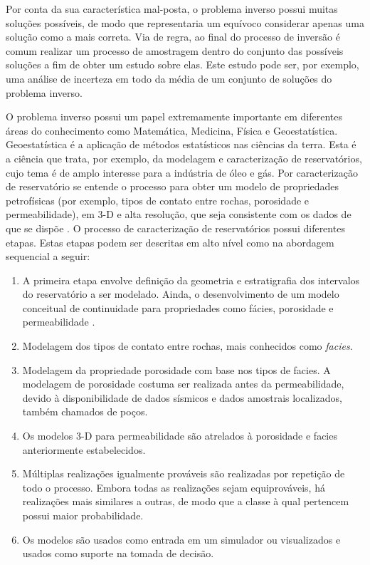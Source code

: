 Por conta da sua característica mal-posta, o problema inverso
possui muitas soluções possíveis, de modo que representaria um equívoco considerar apenas
uma solução como a mais correta. Via de regra, ao final do processo de inversão é comum
realizar um processo de amostragem dentro do conjunto das possíveis soluções a fim
de obter um estudo sobre elas. Este estudo pode ser, por exemplo, uma análise de 
incerteza em todo da média de um conjunto de soluções do problema inverso.

O problema inverso possui um papel extremamente importante em diferentes áreas do conhecimento
como Matemática, Medicina, Física e Geoestatística. Geoestatística é a aplicação de métodos
estatísticos nas ciências da terra. Esta é a ciência que trata, por exemplo, da modelagem
e caracterização de reservatórios, cujo tema é de amplo interesse para a indústria de óleo
e gás. Por caracterização de reservatório se entende o processo para obter um modelo de propriedades
petrofísicas (por exemplo, tipos de contato entre rochas, porosidade e permeabilidade),
em 3-D e alta resolução, que seja consistente com os dados de que se dispõe \cite{deutsch2002}.
O processo de caracterização de reservatórios possui diferentes
etapas. Estas etapas podem ser descritas em alto nível como na
abordagem sequencial a seguir:
\begin{enumerate}
 \item A primeira etapa envolve definição da geometria e estratigrafia dos intervalos do reservatório
 a ser modelado. Ainda, o desenvolvimento de um modelo conceitual de continuidade para
 propriedades como fácies, porosidade e permeabilidade \label{itm:1}.
 \item Modelagem dos tipos de contato entre rochas, mais conhecidos como \textit{facies}\label{itm:2}.
 \item Modelagem da propriedade porosidade com base nos tipos de facies. A modelagem de porosidade
 costuma ser realizada antes da permeabilidade, devido à disponibilidade de dados sísmicos e dados
 amostrais localizados, também chamados de poços\label{itm:3}.
 \item Os modelos 3-D para permeabilidade são atrelados à porosidade e facies anteriormente estabelecidos\label{itm:4}.
 \item Múltiplas realizações igualmente prováveis são realizadas por repetição de todo o processo. Embora todas as
 realizações sejam equiprováveis, há realizações mais similares a outras, de modo que a classe à qual pertencem possui
 maior probabilidade\label{itm:5}.
 \item Os modelos são usados como entrada em um simulador ou visualizados e usados como suporte na tomada de decisão\label{itm:6}.
\end{enumerate}

